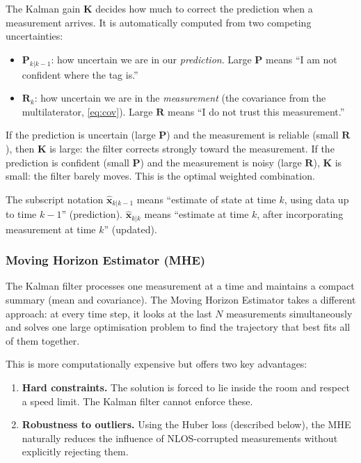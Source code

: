 \documentclass[11pt,a4paper]{article}
\newcommand{\vect}[1]{\bm{#1}}
\newcommand{\mat}[1]{\mathbf{#1}}
\begin{document}
\begin{intubox}[Understanding the Kalman gain $\mat{K}$]
The Kalman gain $\mat{K}$ decides how much to correct the prediction when a measurement arrives. It is automatically computed from two competing uncertainties:
\begin{itemize}[leftmargin=1.5em, topsep=2pt]
  \item $\mat{P}_{k|k-1}$: how uncertain we are in our \emph{prediction}. Large $\mat{P}$ means ``I am not confident where the tag is.''
  \item $\mat{R}_k$: how uncertain we are in the \emph{measurement} (the covariance from the multilaterator, \cref{eq:cov}). Large $\mat{R}$ means ``I do not trust this measurement.''
\end{itemize}
If the prediction is uncertain (large $\mat{P}$) and the measurement is reliable (small $\mat{R}$), then $\mat{K}$ is large: the filter corrects strongly toward the measurement. If the prediction is confident (small $\mat{P}$) and the measurement is noisy (large $\mat{R}$), $\mat{K}$ is small: the filter barely moves. This is the optimal weighted combination.
\end{intubox}

The subscript notation $\hat{\vect{x}}_{k|k-1}$ means ``estimate of state at time $k$, using data up to time $k-1$'' (prediction). $\hat{\vect{x}}_{k|k}$ means ``estimate at time $k$, after incorporating measurement at time $k$'' (updated).

\subsubsection{Moving Horizon Estimator (MHE)}

\begin{intubox}
The Kalman filter processes one measurement at a time and maintains a compact summary (mean and covariance). The Moving Horizon Estimator takes a different approach: at every time step, it looks at the last $N$ measurements simultaneously and solves one large optimisation problem to find the trajectory that best fits all of them together.

This is more computationally expensive but offers two key advantages:
\begin{enumerate}[leftmargin=1.5em, topsep=2pt]
  \item \textbf{Hard constraints.} The solution is forced to lie inside the room and respect a speed limit. The Kalman filter cannot enforce these.
  \item \textbf{Robustness to outliers.} Using the Huber loss (described below), the MHE naturally reduces the influence of NLOS-corrupted measurements without explicitly rejecting them.
\end{enumerate}
\end{intubox}
\end{document}
